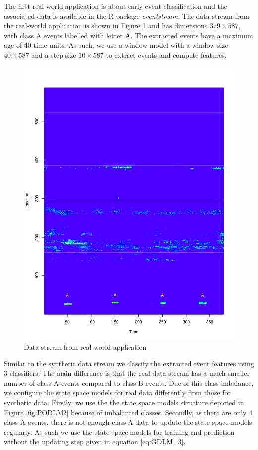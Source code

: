 \documentclass[a4paper,11pt]{article}
\begin{document}
The first real-world application is about early event classification and the associated data is available in the R package \textit{eventstream}. The data stream from the real-world application is shown in Figure \ref{fig:Real_World_Data_Stream} and has dimensions $379 \times 587 $, with class A events labelled with letter {\bf A}. The extracted events have a maximum age of 40 time units. As such, we use a window model with a window size $40 \times 587$ and a step size $ 10 \times 587$ to extract events and compute features.
\begin{figure}[!ht]
	\centering
	\includegraphics[scale=0.5]{./Graphics/Real_World_stream.pdf}
	\caption{\footnotesize Data stream from real-world application}
	\label{fig:Real_World_Data_Stream}
\end{figure}

Similar to the synthetic data stream we classify the extracted event features using 3 classifiers. The main difference is that the real data stream has a much smaller number of class A events compared to class B events. Due of this class imbalance, we configure the state space models for real data differently from those for synthetic data. Firstly, we use the the state space models structure depicted in Figure \ref{fig:PODLM2} because of imbalanced classes. Secondly, as there are only $4$ class A events, there is not enough class A data to update the state space models regularly. As such we use the state space models for training and prediction without the updating step given in equation \eqref{eq:GDLM_3}.
\end{document}
